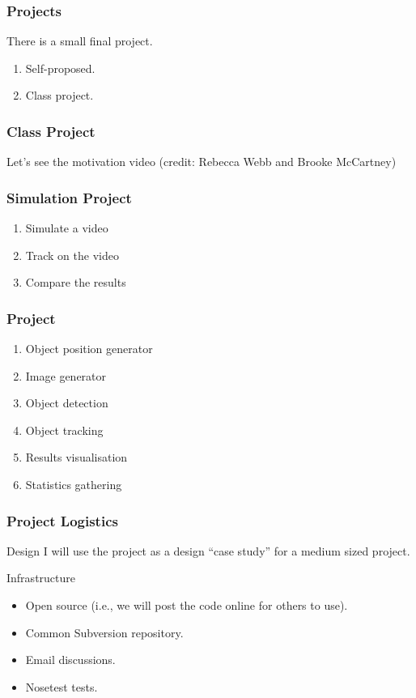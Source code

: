 \begin{frame}[fragile]
\frametitle{Projects}

There is a small final project.

\begin{enumerate}
\item Self-proposed.
\item Class project.
\end{enumerate}
\end{frame}

\begin{frame}[fragile]
\frametitle{Class Project}

Let's see the motivation video (credit: Rebecca Webb and Brooke McCartney)
\end{frame}

\begin{frame}[fragile]
\frametitle{Simulation Project}

\begin{enumerate}
\item Simulate a video
\item Track on the video
\item Compare the results
\end{enumerate}
\end{frame}

\begin{frame}[fragile]
\frametitle{Project}
\begin{enumerate}
\item Object position generator
\item Image generator
\item Object detection
\item Object tracking
\item Results visualisation
\item Statistics gathering
\end{enumerate}
\end{frame}

\begin{frame}[fragile]
\frametitle{Project Logistics}

\begin{block}{Design}
I will use the project as a design ``case study'' for a medium sized project.
\end{block}

\begin{block}{Infrastructure}
\begin{itemize}
\item Open source (i.e., we will post the code online for others to use).
\item Common Subversion repository.
\item Email discussions.
\item Nosetest tests.
\end{itemize}
\end{block}

\end{frame}


